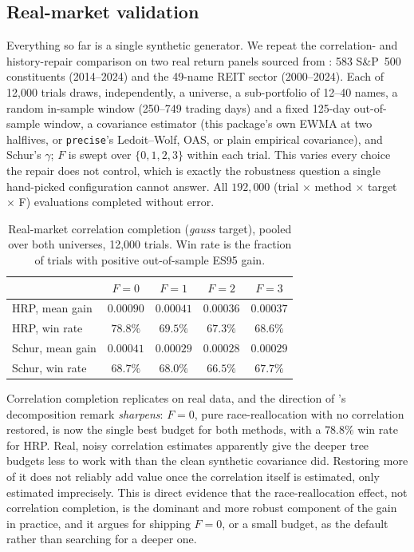 \documentclass[11pt]{article}
\begin{document}
\subsection{Real-market validation}
\label{sec:realmarket}

Everything so far is a single synthetic generator. We repeat the correlation-
and history-repair comparison on two real return panels sourced from
\textcite{winningportstudy}: 583 S\&P~500 constituents (2014--2024) and the
49-name REIT sector (2000--2024). Each of 12{,}000 trials draws, independently,
a universe, a sub-portfolio of 12--40 names, a random in-sample window
(250--749 trading days) and a fixed 125-day out-of-sample window, a covariance
estimator (this package's own EWMA at two halflives, or \texttt{precise}'s
Ledoit--Wolf, OAS, or plain empirical covariance), and Schur's $\gamma$; $F$
is swept over $\{0,1,2,3\}$ within each trial. This varies every choice the
repair does not control, which is exactly the robustness question a single
hand-picked configuration cannot answer. All $192{,}000$ (trial $\times$
method $\times$ target $\times$ F) evaluations completed without error.

\begin{table}[h]
\centering
\caption{Real-market correlation completion (\emph{gauss} target), pooled
over both universes, 12{,}000 trials. Win rate is the fraction of trials with
positive out-of-sample ES95 gain.}
\label{tab:realmarket}
\small
\begin{tabular}{lcccc}
\toprule
 & $F=0$ & $F=1$ & $F=2$ & $F=3$ \\
\midrule
HRP, mean gain    & $\mathbf{0.00090}$ & $0.00041$ & $0.00036$ & $0.00037$ \\
HRP, win rate     & $\mathbf{78.8\%}$  & $69.5\%$  & $67.3\%$  & $68.6\%$  \\
Schur, mean gain  & $\mathbf{0.00041}$ & $0.00029$ & $0.00028$ & $0.00029$ \\
Schur, win rate   & $\mathbf{68.7\%}$  & $68.0\%$  & $66.5\%$  & $67.7\%$  \\
\bottomrule
\end{tabular}
\end{table}

Correlation completion replicates on real data, and the direction of
's decomposition remark \emph{sharpens}: $F=0$, pure
race-reallocation with no correlation restored, is now the single best
budget for both methods, with a $78.8\%$ win rate for HRP. Real, noisy
correlation estimates apparently give the deeper tree budgets less to work
with than the clean synthetic covariance did. Restoring more of it does not
reliably add value once the correlation itself is estimated, only estimated
imprecisely. This is direct evidence that the race-reallocation effect, not
correlation completion, is the dominant and more robust component of the
gain in practice, and it argues for shipping $F=0$, or a small budget, as
the default rather than searching for a deeper one.
\end{document}
